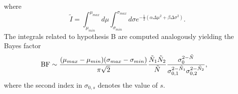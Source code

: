 \begin{example}
	where
	\begin{equation}
		\tilde{I} = \int_{\mu_{min}}^{\mu_{max}}d\mu\int_{\sigma_{min}}^{\sigma_{max}}d\sigma e^{-\frac{1}{2}(\alpha\Delta\mu^2+\beta\Delta\sigma^2)}.
	\end{equation}
	The integrals related to hypothesis B are computed analogously yielding the Bayes factor
	\begin{equation}
		\begin{split}
			\rm BF &\sim  \frac{(\mu_{max}-\mu_{min})(\sigma_{max}-\sigma_{min})}{\pi \sqrt{2}}\frac{\tilde{N}_1\tilde{N}_2}{\tilde{N}}\frac{\sigma_0^{2-\tilde{N}}}{\sigma_{0,1}^{2-\tilde{N}_1}\sigma_{0,2}^{2-\tilde{N}_2}},
		\end{split}
	\end{equation}
	where the second index in $\sigma_{0,s}$ denotes the value of $s$.
	

\end{example}

